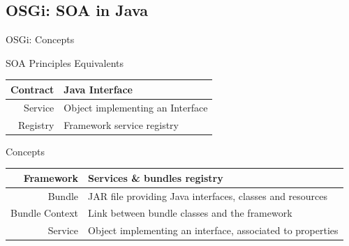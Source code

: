 \subsection{OSGi: SOA in Java}

\begin{frame}{OSGi: Concepts}
\begin{block}{SOA Principles Equivalents}
\begin{center}
\begin{small}
\begin{tabular}{rp{}}
Contract & Java Interface\\
\hline
Service & Object implementing an Interface\\
\hline
Registry & Framework service registry\\
\end{tabular}
\end{small}
\end{center}
\end{block}

\begin{block}{Concepts}
\begin{center}
\begin{small}
\begin{tabular}{rp{}}
Framework & Services \& bundles registry\\
\hline
Bundle & JAR file providing Java interfaces, classes and resources\\
\hline
Bundle Context & Link between bundle classes and the framework\\
\hline
Service & Object implementing an interface, associated to properties\\
\end{tabular}
\end{small}
\end{center}
\end{block}
\end{frame}

